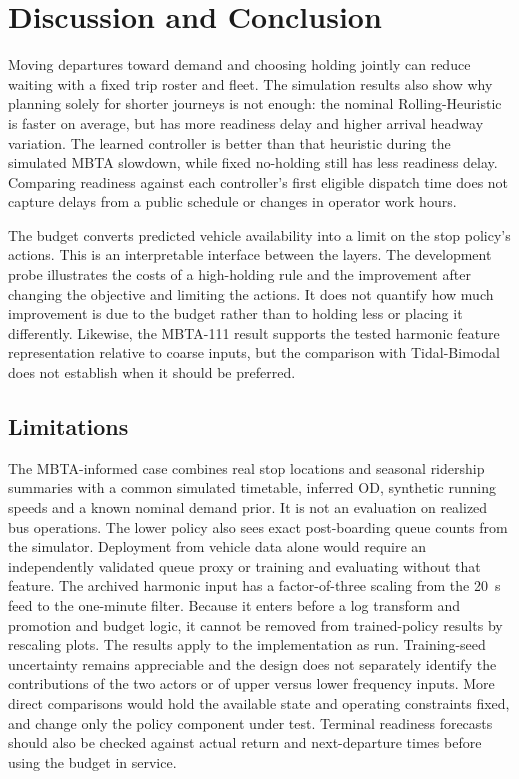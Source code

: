\section{Discussion and Conclusion}
\label{sec:conclusion}

Moving departures toward demand and choosing holding jointly can reduce waiting with a fixed trip roster and fleet. The simulation results also show why planning solely for shorter journeys is not enough: the nominal Rolling-Heuristic is faster on average, but has more readiness delay and higher arrival headway variation. The learned controller is better than that heuristic during the simulated MBTA slowdown, while fixed no-holding still has less readiness delay. Comparing readiness against each controller's first eligible dispatch time does not capture delays from a public schedule or changes in operator work hours.

The budget converts predicted vehicle availability into a limit on the stop policy's actions. This is an interpretable interface between the layers. The development probe illustrates the costs of a high-holding rule and the improvement after changing the objective and limiting the actions. It does not quantify how much improvement is due to the budget rather than to holding less or placing it differently. Likewise, the MBTA-111 result supports the tested harmonic feature representation relative to coarse inputs, but the comparison with Tidal-Bimodal does not establish when it should be preferred.

\subsection{Limitations}
The MBTA-informed case combines real stop locations and seasonal ridership summaries with a common simulated timetable, inferred OD, synthetic running speeds and a known nominal demand prior. It is not an evaluation on realized bus operations. The lower policy also sees exact post-boarding queue counts from the simulator. Deployment from vehicle data alone would require an independently validated queue proxy or training and evaluating without that feature. The archived harmonic input has a factor-of-three scaling from the 20~s feed to the one-minute filter. Because it enters before a log transform and promotion and budget logic, it cannot be removed from trained-policy results by rescaling plots. The results apply to the implementation as run. Training-seed uncertainty remains appreciable and the design does not separately identify the contributions of the two actors or of upper versus lower frequency inputs. More direct comparisons would hold the available state and operating constraints fixed, and change only the policy component under test. Terminal readiness forecasts should also be checked against actual return and next-departure times before using the budget in service.


